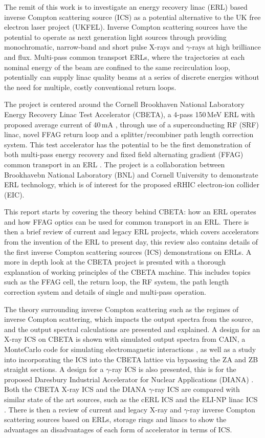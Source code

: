 \documentclass[11pt]{article}
\begin{document}
The remit of this work is to investigate an energy recovery linac (ERL) based inverse Compton scattering source (ICS) as a potential alternative to the UK free electron laser project (UKFEL). Inverse Compton scattering sources have the potential to operate as next generation light sources through providing monochromatic, narrow-band and short pulse X-rays and $\gamma$-rays at high brilliance and flux. Multi-pass common transport ERLs, where the trajectories at each nominal energy of the beam are confined to the same recirculation loop, potentially can supply linac quality beams at a series of discrete energies without the need for multiple, costly conventional return loops.

The project is centered around the Cornell Brookhaven National Laboratory Energy Recovery Linac Test Accelerator (CBETA), a 4-pass 150\,MeV ERL with proposed average current of 40\,mA \cite{IPAC2018CBETA}, through use of a superconducting RF (SRF) linac, novel FFAG return loop and a splitter/recombiner path length correction system. This test accelerator has the potential to be the first demonstration of both multi-pass energy recovery and fixed field alternating gradient (FFAG) common transport in an ERL \cite{DejanIPAC2017}. The project is a collaboration between Brookhavebn National Laboratory (BNL) and Cornell University to demonstrate ERL technology, which is of interest for the proposed eRHIC \cite{eRHIC} electron-ion collider (EIC).

This report starts by covering the theory behind CBETA: how an ERL operates and how FFAG optics can be used for common transport in an ERL. There is then a brief review of current and legacy ERL projects, which covers accelerators from the invention of the ERL to present day, this review also contains details of the first inverse Compton scattering sources (ICS) demonstrations on ERLs. A more in depth look at the CBETA project is presnted with a thorough explanation of working principles of the CBETA machine. This includes topics such as the FFAG cell, the return loop, the RF system, the path length correction system and details of single and multi-pass operation.

The theory surrounding inverse Compton scattering such as the regimes of inverse Compton scattering, which impacts the output spectra from the source, and the output spectral calculations are presented and explained. A design for an X-ray ICS on CBETA is shown with simulated output spectra from CAIN, a MonteCarlo code for simulating electromagnetic interactions \cite{CAIN}, as well as a study into incorporating the ICS into the CBETA lattice via bypassing the ZA and ZB straight sections. A design for a $\gamma$-ray ICS is also presented, this is for the proposed Daresbury Industrial Accelerator for Nuclear Applications (DIANA) \cite{PWDIANA}. Both the CBETA X-ray ICS and the DIANA $\gamma$-ray ICS are compared with similar state of the art sources, such as the cERL ICS \cite{TAkagicERL} and the ELI-NP linac ICS \cite{ELINPwp}. There is then a review of current and legacy X-ray and $\gamma$-ray inverse Compton scattering sources based on ERLs, storage rings and linacs to show the advantages an disadvantages of each form of accelerator in terms of ICS.
\end{document}
